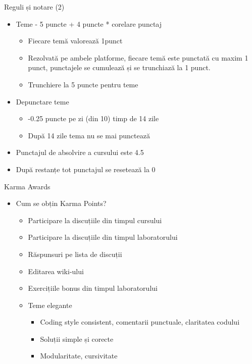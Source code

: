 \documentclass{so.cs.pub.ro}
\begin{document}
\begin{frame}{Reguli și notare (2)}
  	\begin{itemize}  
		\item Teme - 5 puncte + 4 puncte * corelare punctaj
		\begin{itemize}
			\item Fiecare temă valorează 1punct
			\item Rezolvată pe ambele platforme, fiecare temă este punctată cu maxim 1 punct, punctajele se cumulează și se trunchiază la 1 punct.
			\item Trunchiere la 5 puncte pentru teme 
		\end{itemize}
		\item Depunctare teme
		\begin{itemize}
			\item -0.25 puncte pe zi (din 10) timp de 14 zile
			\item După 14 zile tema nu se mai punctează
		\end{itemize}
		\item Punctajul de absolvire a cursului este 4.5
		\item După restanțe tot punctajul se resetează la 0
    	\end{itemize}		
\end{frame}

\begin{frame}{Karma Awards}
  	\begin{itemize}   
    		\item Cum se obțin Karma Points?
		\begin{itemize}
			\item Participare la discuțiile din timpul cursului
			\item Participare la discuțiile din timpul laboratorului
			\item Răspunsuri pe lista de discuții
			\item Editarea wiki-ului
			\item Exercițiile bonus din timpul laboratorului
			\item Teme elegante
			\begin{itemize}
				\item Coding style consistent, comentarii punctuale, claritatea codului
				\item Soluții simple și corecte
				\item Modularitate, cursivitate 
			\end{itemize}
		\end{itemize}
    	\end{itemize}		
\end{frame}
\end{document}
